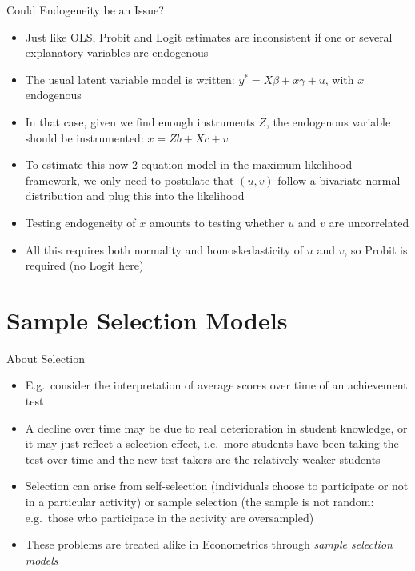 \documentclass[aspectratio=169]{beamer}
\begin{document}
\begin{frame}{Could Endogeneity be an Issue?}
\begin{itemize}
    \item Just like OLS, Probit and Logit estimates are inconsistent if one or several explanatory variables are endogenous
    \item The usual latent variable model is written: $y^* = X\beta + x\gamma + u$, with $x$ endogenous
    \item In that case, given we find enough instruments $Z$, the endogenous variable should be instrumented: $x = Zb + Xc + v$
    \item To estimate this now 2-equation model in the maximum likelihood framework, we only need to postulate that $(u, v)$ follow a bivariate normal distribution and plug this into the likelihood
    \item Testing endogeneity of $x$ amounts to testing whether $u$ and $v$ are uncorrelated
    \item All this requires both normality and homoskedasticity of $u$ and $v$, so Probit is required (no Logit here)
\end{itemize}
\end{frame}

\section{Sample Selection Models}

\begin{frame}{About Selection}
\begin{itemize}
    \item E.g.\ consider the interpretation of average scores over time of an achievement test
    \item A decline over time may be due to real deterioration in student knowledge, or it may just reflect a selection effect, i.e.\ more students have been taking the test over time and the new test takers are the relatively weaker students
    \item Selection can arise from self-selection (individuals choose to participate or not in a particular activity) or sample selection (the sample is not random: e.g.\ those who participate in the activity are oversampled)
    \item These problems are treated alike in Econometrics through \textit{sample selection models}
\end{itemize}
\end{frame}
\end{document}
